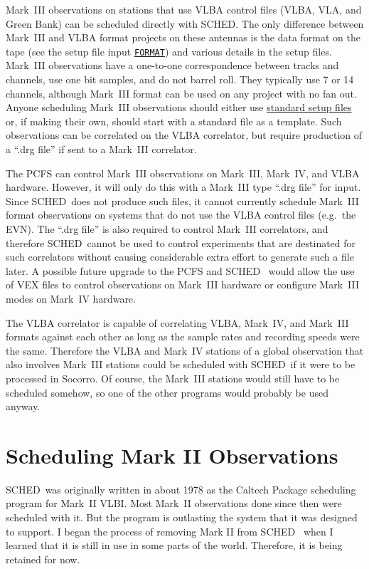 \documentclass{report}
\newcommand{\sched}{{\sc SCHED}}
\newcommand{\schedb}{{\sc SCHED~}}
\begin{document}
Mark~III observations on stations that use VLBA control files (VLBA,
VLA, and Green Bank) can be scheduled directly with \sched.  The only
difference between Mark~III and VLBA format projects on these antennas
is the data format on the tape (see the setup file input 
{\hyperref[SP:FORMAT]{{\tt FORMAT}}})
and various details in the setup files.  Mark~III
observations have a one-to-one correspondence between tracks and
channels, use one bit samples, and do not barrel roll.  They typically
use 7 or 14 channels, although Mark~III format can be used on any
project with no fan out.  Anyone scheduling Mark~III observations
should either use 
{\hyperref[SSEC:SETSTD]{standard setup files}} or, if
making their own, should start with a standard file as a template.
Such observations can be correlated on the VLBA correlator, but
require production of a ``.drg file'' if sent to a Mark~III correlator.

The PCFS can control Mark~III observations on Mark~III, Mark~IV, and
VLBA hardware.  However, it will only do this with a Mark~III type
``.drg file'' for input.  Since \schedb does not produce such files,
it cannot currently schedule Mark~III format observations on systems
that do not use the VLBA control files (e.g.\ the EVN).  The ``.drg
file'' is also required to control Mark~III correlators, and therefore
\schedb cannot be used to control experiments that are destinated for
such correlators without causing considerable extra effort to generate
such a file later.  A possible future upgrade to the PCFS and \schedb
would allow the use of VEX files to control observations on Mark~III
hardware or configure Mark~III modes on Mark~IV hardware.

The VLBA correlator is capable of correlating VLBA, Mark~IV, and
Mark~III formats against each other as long as the sample rates and
recording speeds were the same.  Therefore the VLBA and Mark~IV
stations of a global observation that also involves Mark~III stations
could be scheduled with \schedb if it were to be processed in Socorro.
Of course, the Mark~III stations would still have to be scheduled
somehow, so one of the other programs would probably be used anyway.


\section{\label{SEC:MKII}Scheduling Mark II Observations}

\schedb was originally written in about 1978 as the Caltech
Package scheduling program for Mark~II VLBI.  Most Mark~II
observations done since then were scheduled with it.  But the
program is outlasting the system that it was designed to
support.  I began the process of removing Mark II from \schedb
when I learned that it is still in use in some parts of the
world.  Therefore, it is being retained for now.
\end{document}
